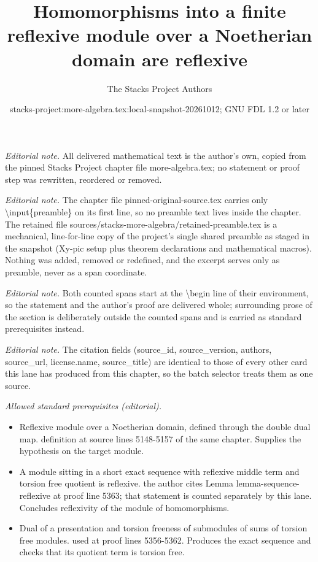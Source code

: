 \documentclass[10pt,a4paper]{amsart}
\title{Homomorphisms into a finite reflexive module over a Noetherian domain are reflexive}
\author{The Stacks Project Authors}
\date{stacks-project:more-algebra.tex:local-snapshot-20261012; GNU FDL 1.2 or later}
\theoremstyle{plain}
\theoremstyle{definition}
\theoremstyle{remark}
\numberwithin{equation}{subsection}
\begin{document}
\maketitle
\setcounter{subsection}{1}
\noindent\textit{Editorial note.} All delivered mathematical text is the author's own, copied from the pinned Stacks Project chapter file more-algebra.tex; no statement or proof step was rewritten, reordered or removed.\par\medskip
\noindent\textit{Editorial note.} The chapter file pinned-original-source.tex carries only \textbackslash{}input\{preamble\} on its first line, so no preamble text lives inside the chapter. The retained file sources/stacks-more-algebra/retained-preamble.tex is a mechanical, line-for-line copy of the project's single shared preamble as staged in the snapshot (Xy-pic setup plus theorem declarations and mathematical macros). Nothing was added, removed or redefined, and the excerpt serves only as preamble, never as a span coordinate.\par\medskip
\noindent\textit{Editorial note.} Both counted spans start at the \textbackslash{}begin line of their environment, so the statement and the author's proof are delivered whole; surrounding prose of the section is deliberately outside the counted spans and is carried as standard prerequisites instead.\par\medskip
\noindent\textit{Editorial note.} The citation fields (source\_id, source\_version, authors, source\_url, license.name, source\_title) are identical to those of every other card this lane has produced from this chapter, so the batch selector treats them as one source.\par\medskip
\noindent\textit{Allowed standard prerequisites (editorial).}\begin{itemize}
\item Reflexive module over a Noetherian domain, defined through the double dual map. definition at source lines 5148-5157 of the same chapter. Supplies the hypothesis on the target module.
\item A module sitting in a short exact sequence with reflexive middle term and torsion free quotient is reflexive. the author cites Lemma lemma-sequence-reflexive at proof line 5363; that statement is counted separately by this lane. Concludes reflexivity of the module of homomorphisms.
\item Dual of a presentation and torsion freeness of submodules of sums of torsion free modules. used at proof lines 5356-5362. Produces the exact sequence and checks that its quotient term is torsion free.
\end{itemize}\medskip
\end{document}
